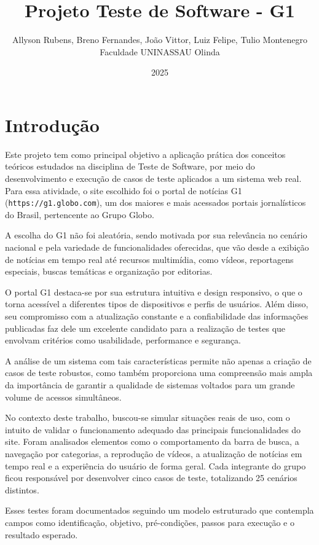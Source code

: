 \documentclass[12pt]{article}
\title{Projeto Teste de Software - G1}
\author{Allyson Rubens, Breno Fernandes, João Vittor, Luiz Felipe, Tulio Montenegro\\
Faculdade UNINASSAU Olinda}
\date{2025}
\begin{document}
\maketitle

\section*{Introdução}

Este projeto tem como principal objetivo a aplicação prática dos conceitos teóricos estudados na disciplina de Teste de Software, por meio do desenvolvimento e execução de casos de teste aplicados a um sistema web real. Para essa atividade, o site escolhido foi o portal de notícias G1 (\texttt{https://g1.globo.com}), um dos maiores e mais acessados portais jornalísticos do Brasil, pertencente ao Grupo Globo.

A escolha do G1 não foi aleatória, sendo motivada por sua relevância no cenário nacional e pela variedade de funcionalidades oferecidas, que vão desde a exibição de notícias em tempo real até recursos multimídia, como vídeos, reportagens especiais, buscas temáticas e organização por editorias.

O portal G1 destaca-se por sua estrutura intuitiva e design responsivo, o que o torna acessível a diferentes tipos de dispositivos e perfis de usuários. Além disso, seu compromisso com a atualização constante e a confiabilidade das informações publicadas faz dele um excelente candidato para a realização de testes que envolvam critérios como usabilidade, performance e segurança.

A análise de um sistema com tais características permite não apenas a criação de casos de teste robustos, como também proporciona uma compreensão mais ampla da importância de garantir a qualidade de sistemas voltados para um grande volume de acessos simultâneos.

No contexto deste trabalho, buscou-se simular situações reais de uso, com o intuito de validar o funcionamento adequado das principais funcionalidades do site. Foram analisados elementos como o comportamento da barra de busca, a navegação por categorias, a reprodução de vídeos, a atualização de notícias em tempo real e a experiência do usuário de forma geral. Cada integrante do grupo ficou responsável por desenvolver cinco casos de teste, totalizando 25 cenários distintos.

Esses testes foram documentados seguindo um modelo estruturado que contempla campos como identificação, objetivo, pré-condições, passos para execução e o resultado esperado.
\end{document}
